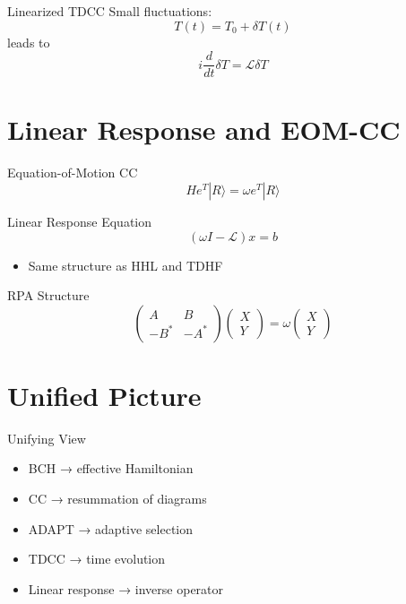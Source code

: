 \documentclass{beamer}
\begin{document}

\begin{frame}{Linearized TDCC}
Small fluctuations:
\[
T(t) = T_0 + \delta T(t)
\]
leads to
\[
i \frac{d}{dt} \delta T = \mathcal{L} \delta T
\]
\end{frame}

\section{Linear Response and EOM-CC}

\begin{frame}{Equation-of-Motion CC}
\[
H e^T |R\rangle = \omega e^T |R\rangle
\]
\end{frame}


\begin{frame}{Linear Response Equation}
\[
(\omega I - \mathcal{L}) x = b
\]
\begin{itemize}
\item Same structure as HHL and TDHF
\end{itemize}
\end{frame}


\begin{frame}{RPA Structure}
\[
\begin{pmatrix}
A & B \\
-B^* & -A^*
\end{pmatrix}
\begin{pmatrix}
X \\ Y
\end{pmatrix}
=
\omega
\begin{pmatrix}
X \\ Y
\end{pmatrix}
\]
\end{frame}

\section{Unified Picture}

\begin{frame}{Unifying View}
\begin{itemize}
\item BCH → effective Hamiltonian
\item CC → resummation of diagrams
\item ADAPT → adaptive selection
\item TDCC → time evolution
\item Linear response → inverse operator
\end{itemize}
\end{frame}
\end{document}
